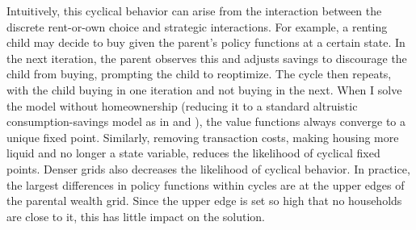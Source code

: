 \documentclass[12pt]{article}
\begin{document}
Intuitively, this cyclical behavior can arise from the interaction between the discrete rent-or-own choice and strategic interactions. For example, a renting child may decide to buy given the parent's policy functions at a certain state. In the next iteration, the parent observes this and adjusts savings to discourage the child from buying, prompting the child to reoptimize. The cycle then repeats, with the child buying in one iteration and not buying in the next. When I solve the model without homeownership (reducing it to a standard altruistic consumption-savings model as in \cite{Barczyk2020a} and \cite{Chu2020}), the value functions always converge to a unique fixed point. Similarly, removing transaction costs, making housing more liquid and no longer a state variable, reduces the likelihood of cyclical fixed points. Denser grids also decreases the likelihood of cyclical behavior. In practice, the largest differences in policy functions within cycles are at the upper edges of the parental wealth grid. Since the upper edge is set so high that no households are close to it, this has little impact on the solution.
\end{document}
